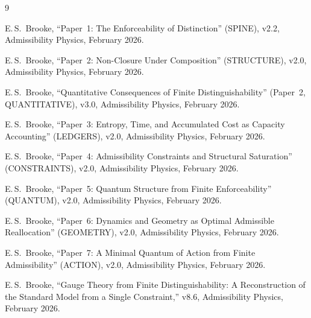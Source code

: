 \documentclass[11pt]{article}
\begin{document}
\begin{thebibliography}{9}

E.\,S.~Brooke, ``Paper~1: The Enforceability of Distinction'' (SPINE), v2.2, Admissibility Physics, February 2026.

E.\,S.~Brooke, ``Paper~2: Non-Closure Under Composition'' (STRUCTURE), v2.0, Admissibility Physics, February 2026.

E.\,S.~Brooke, ``Quantitative Consequences of Finite Distinguishability'' (Paper~2, QUANTITATIVE), v3.0, Admissibility Physics, February 2026.

E.\,S.~Brooke, ``Paper~3: Entropy, Time, and Accumulated Cost as Capacity Accounting'' (LEDGERS), v2.0, Admissibility Physics, February 2026.

E.\,S.~Brooke, ``Paper~4: Admissibility Constraints and Structural Saturation'' (CONSTRAINTS), v2.0, Admissibility Physics, February 2026.

E.\,S.~Brooke, ``Paper~5: Quantum Structure from Finite Enforceability'' (QUANTUM), v2.0, Admissibility Physics, February 2026.

E.\,S.~Brooke, ``Paper~6: Dynamics and Geometry as Optimal Admissible Reallocation'' (GEOMETRY), v2.0, Admissibility Physics, February 2026.

E.\,S.~Brooke, ``Paper~7: A Minimal Quantum of Action from Finite Admissibility'' (ACTION), v2.0, Admissibility Physics, February 2026.

E.\,S.~Brooke, ``Gauge Theory from Finite Distinguishability: A Reconstruction of the Standard Model from a Single Constraint,'' v8.6, Admissibility Physics, February 2026.

\end{thebibliography}
\end{document}
